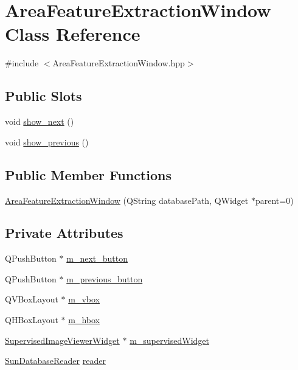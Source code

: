\hypertarget{class_area_feature_extraction_window}{\section{Area\+Feature\+Extraction\+Window Class Reference}
\label{class_area_feature_extraction_window}
}


{\ttfamily \#include $<$Area\+Feature\+Extraction\+Window.\+hpp$>$}

\subsection*{Public Slots}
\begin{DoxyCompactItemize}
\item 
void \hyperlink{class_area_feature_extraction_window_aa478c08abe712412d90fa48936c05fa1}{show\+\_\+next} ()
\item 
void \hyperlink{class_area_feature_extraction_window_ab0f1fc10645d98e916faea9a94cf2a15}{show\+\_\+previous} ()
\end{DoxyCompactItemize}
\subsection*{Public Member Functions}
\begin{DoxyCompactItemize}
\item 
\hyperlink{class_area_feature_extraction_window_abcf541b8a70c5122524facefd7fc3f4b}{Area\+Feature\+Extraction\+Window} (Q\+String database\+Path, Q\+Widget $\ast$parent=0)
\end{DoxyCompactItemize}
\subsection*{Private Attributes}
\begin{DoxyCompactItemize}
\item 
Q\+Push\+Button $\ast$ \hyperlink{class_area_feature_extraction_window_aeac146ce4d4824383ae3387200771c8c}{m\+\_\+next\+\_\+button}
\item 
Q\+Push\+Button $\ast$ \hyperlink{class_area_feature_extraction_window_af79c0e607fea8013225fdd1142fba23a}{m\+\_\+previous\+\_\+button}
\item 
Q\+V\+Box\+Layout $\ast$ \hyperlink{class_area_feature_extraction_window_ab76bcfe16b8e327f97114dd56787eaec}{m\+\_\+vbox}
\item 
Q\+H\+Box\+Layout $\ast$ \hyperlink{class_area_feature_extraction_window_a5664dd1b2be2c4726cc016ced8828fc3}{m\+\_\+hbox}
\item 
\hyperlink{class_supervised_image_viewer_widget}{Supervised\+Image\+Viewer\+Widget} $\ast$ \hyperlink{class_area_feature_extraction_window_a5e92f22f7471682136650c210abb34d3}{m\+\_\+supervised\+Widget}
\item 
\hyperlink{class_sun_database_reader}{Sun\+Database\+Reader} \hyperlink{class_area_feature_extraction_window_a428a7715193feb571ec8ba70fe55fc4d}{reader}
\end{DoxyCompactItemize}



